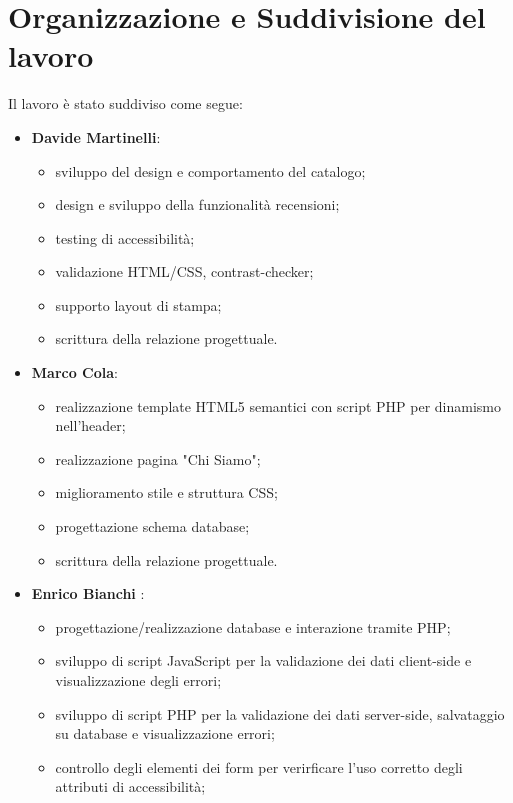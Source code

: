\documentclass{article}
\begin{document}
\section{Organizzazione e Suddivisione del lavoro}
Il lavoro è stato suddiviso come segue:
\begin{itemize}
    \item \textbf{Davide Martinelli}:
            \begin{itemize}
                \item sviluppo del design e comportamento del catalogo;
                \item design e sviluppo della funzionalità recensioni;
                \item testing di accessibilità;
                \item validazione HTML/CSS, contrast-checker;
                \item supporto layout di stampa;
                \item scrittura della relazione progettuale.
            \end{itemize}
    \item \textbf{Marco Cola}:
        \begin{itemize}
            \item realizzazione template HTML5 semantici con script PHP per dinamismo nell'header;
            \item realizzazione pagina "Chi Siamo";
            \item miglioramento stile e struttura CSS;
            \item progettazione schema database;
            \item scrittura della relazione progettuale.
        \end{itemize}
    \item \textbf{Enrico Bianchi} :
            \begin{itemize}
                \item progettazione/realizzazione database e interazione tramite PHP;
                \item sviluppo di script JavaScript per la validazione dei dati client-side e visualizzazione degli errori;
                \item sviluppo di script PHP per la validazione dei dati server-side, salvataggio su database e visualizzazione errori;
                \item controllo degli elementi dei form per verirficare l’uso corretto degli attributi di accessibilità;

\end{itemize}
\end{itemize}
\end{document}
